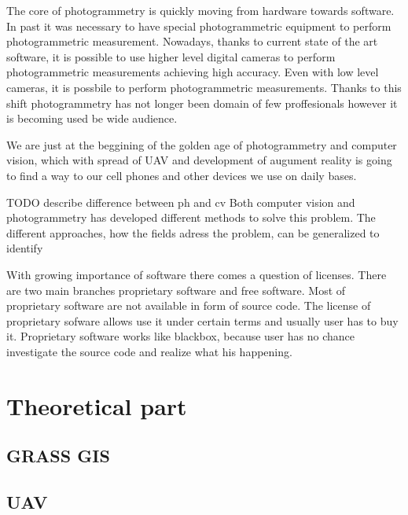 \documentclass[a4paper,12pt]{report}
\begin{document}
The core of photogrammetry is quickly moving  from  hardware towards software. In past it was necessary to have special 
photogrammetric equipment to perform photogrammetric measurement. Nowadays, thanks to current state of the art software, 
 it is possible to use higher level digital cameras to perform photogrammetric measurements achieving
high accuracy. Even with low level cameras, it is possbile to perform photogrammetric measurements. 
Thanks to this shift photogrammetry has not longer been domain of few proffesionals however it is 
becoming used be wide audience. 

We are just at the beggining of the golden age of photogrammetry and computer vision, 
which with spread of UAV and development of augument
reality is going to find a way to our cell phones and other devices we use on daily bases. 

TODO describe difference between ph and cv
Both computer vision and photogrammetry has developed different methods to solve this problem.
The different approaches, how the fields adress the problem, can be generalized to identify 


With growing importance of software there comes a question of licenses. There are two 
main branches proprietary software and free software. Most of proprietary software are not available in 
form of source code. The license of proprietary sofware allows use it under certain terms and usually user 
has to buy it. Proprietary software works like blackbox, because user has no chance investigate the source 
code and realize what his happening. 


\newpage

\chapter{Theoretical part}


\section{GRASS GIS}

\section{UAV}
\end{document}
